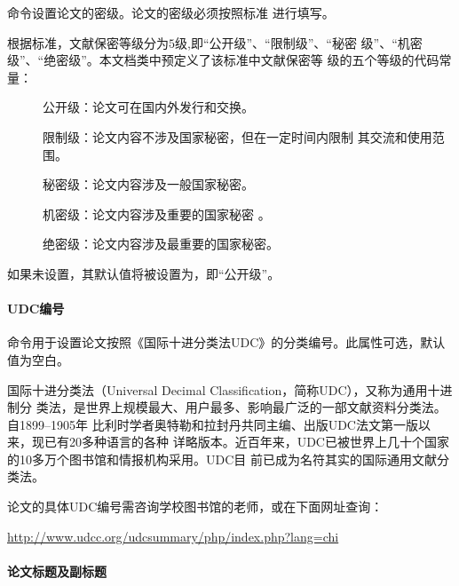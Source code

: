 命令设置论文的密级。论文的密级必须按照标准
\cite{gbt7156-2003}进行填写。

根据标准，文献保密等级分为$5$级,即“公开级”、“限制级”、“秘密
级”、“机密级”、“绝密级”\cite{gbt7156-2003}。本文档类中预定义了该标准中文献保密等
级的五个等级的代码常量：
\begin{description}
\item[] 公开级：论文可在国内外发行和交换。
\item[] 限制级：论文内容不涉及国家秘密，但在一定时间内限制
  其交流和使用范围。
\item[] 秘密级：论文内容涉及一般国家秘密。
\item[] 机密级：论文内容涉及重要的国家秘密 。
\item[] 绝密级：论文内容涉及最重要的国家秘密。
\end{description}

如果未设置，其默认值将被设置为，即“公开级”。

\begin{tex}
\securitylevel{\controllevel}
\end{tex}

\paragraph{UDC编号}

命令用于设置论文按照《国际十进分类法UDC》的分类编号。此属性可选，默认值为空白。
\begin{tex}
\end{tex}

国际十进分类法（Universal Decimal Classification，简称UDC），又称为通用十进制分
类法，是世界上规模最大、用户最多、影响最广泛的一部文献资料分类法。自1899--1905年
比利时学者奥特勒和拉封丹共同主编、出版UDC法文第一版以来，现已有20多种语言的各种
详略版本。近百年来，UDC已被世界上几十个国家的10多万个图书馆和情报机构采用。UDC目
前已成为名符其实的国际通用文献分类法。

论文的具体UDC编号需咨询学校图书馆的老师，或在下面网址查询：
\begin{center}
\url{http://www.udcc.org/udcsummary/php/index.php?lang=chi}
\end{center}

\paragraph{论文标题及副标题}

